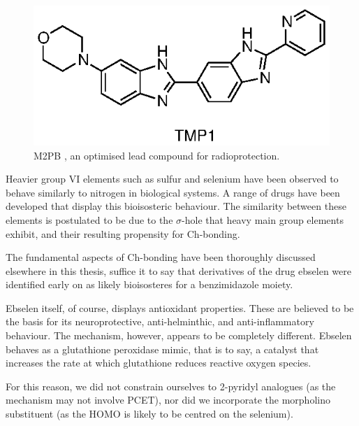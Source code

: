 \begin{refsection}
\begin{figure}
\includegraphics[scale=0.74]{Figures/m2pb.eps}
\caption{M2PB , an optimised lead compound for radioprotection.}\label{fig:m2pb}
\end{figure}


Heavier group VI elements such as sulfur and selenium have been observed to behave similarly to nitrogen in biological systems.
A range of drugs have been developed that display this bioisosteric behaviour\autocite{Beno2015}.
The similarity between these elements is postulated to be due to the $\sigma$-hole that heavy main group elements exhibit, and their resulting propensity for Ch-bonding.

The fundamental aspects of Ch-bonding have been thoroughly discussed elsewhere in this thesis, suffice it to say that derivatives of the drug ebselen  were identified early on as likely bioisosteres for a benzimidazole moiety.


Ebselen itself, of course, displays antioxidant properties.\label{sec:simplification}
These are believed to be the basis for its neuroprotective, anti-helminthic, and anti-inflammatory behaviour.
The mechanism, however, appears to be completely different.
Ebselen behaves as a glutathione peroxidase mimic, that is to say, a catalyst that increases the rate at which glutathione reduces reactive oxygen species.

For this reason, we did not constrain ourselves to 2-pyridyl analogues (as the mechanism may not involve PCET), nor did we incorporate the morpholino substituent (as the HOMO is likely to be centred on the selenium).


\end{refsection}
